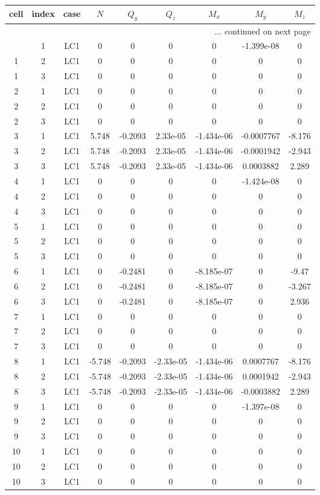\documentclass{article}%
\begin{document}
\begin{longtable}{| c c c | c c c c c c |}%
\hline%
cell&index&case&$N$&$Q_y$&$Q_z$&$M_x$&$M_y$&$M_z$\\%
\hline%
\endhead%
\hline%
\multicolumn{9}{r}{... continued on next page}\\%
\endfoot%
\hline%
\endlastfoot%
1&1&LC1&0&0&0&0&{-}1.399e{-}08&0\\%
1&2&LC1&0&0&0&0&0&0\\%
1&3&LC1&0&0&0&0&0&0\\%
2&1&LC1&0&0&0&0&0&0\\%
2&2&LC1&0&0&0&0&0&0\\%
2&3&LC1&0&0&0&0&0&0\\%
3&1&LC1&5.748&{-}0.2093&2.33e{-}05&{-}1.434e{-}06&{-}0.0007767&{-}8.176\\%
3&2&LC1&5.748&{-}0.2093&2.33e{-}05&{-}1.434e{-}06&{-}0.0001942&{-}2.943\\%
3&3&LC1&5.748&{-}0.2093&2.33e{-}05&{-}1.434e{-}06&0.0003882&2.289\\%
4&1&LC1&0&0&0&0&{-}1.424e{-}08&0\\%
4&2&LC1&0&0&0&0&0&0\\%
4&3&LC1&0&0&0&0&0&0\\%
5&1&LC1&0&0&0&0&0&0\\%
5&2&LC1&0&0&0&0&0&0\\%
5&3&LC1&0&0&0&0&0&0\\%
6&1&LC1&0&{-}0.2481&0&{-}8.185e{-}07&0&{-}9.47\\%
6&2&LC1&0&{-}0.2481&0&{-}8.185e{-}07&0&{-}3.267\\%
6&3&LC1&0&{-}0.2481&0&{-}8.185e{-}07&0&2.936\\%
7&1&LC1&0&0&0&0&0&0\\%
7&2&LC1&0&0&0&0&0&0\\%
7&3&LC1&0&0&0&0&0&0\\%
8&1&LC1&{-}5.748&{-}0.2093&{-}2.33e{-}05&{-}1.434e{-}06&0.0007767&{-}8.176\\%
8&2&LC1&{-}5.748&{-}0.2093&{-}2.33e{-}05&{-}1.434e{-}06&0.0001942&{-}2.943\\%
8&3&LC1&{-}5.748&{-}0.2093&{-}2.33e{-}05&{-}1.434e{-}06&{-}0.0003882&2.289\\%
9&1&LC1&0&0&0&0&{-}1.397e{-}08&0\\%
9&2&LC1&0&0&0&0&0&0\\%
9&3&LC1&0&0&0&0&0&0\\%
10&1&LC1&0&0&0&0&0&0\\%
10&2&LC1&0&0&0&0&0&0\\%
10&3&LC1&0&0&0&0&0&0\\%

\end{longtable}
\end{document}
